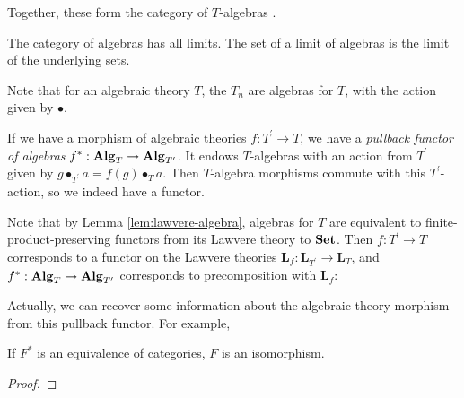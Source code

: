 Together, these form the category of $ T $-algebras .

\begin{remark}
  The category of algebras has all limits. The set of a limit of algebras is the limit of the underlying sets.
\end{remark}

\begin{remark}
  Note that for an algebraic theory $ T $, the $ T_n $ are algebras for $ T $, with the action given by $ \bullet $.
\end{remark}

\begin{definition}\label{def:algebra-pullback}
  If we have a morphism of algebraic theories $ f: T^\prime \to T $, we have a \textit{pullback functor of algebras} $ f^* : \mathbf{Alg}_{T} \to \mathbf{Alg}_{T^\prime} $. It endows $ T $-algebras with an action from $ T^\prime $ given by $ g \bullet_{T^\prime} a = f(g) \bullet_T a $. Then $ T $-algebra morphisms commute with this $ T^\prime $-action, so we indeed have a functor.
\end{definition}

\begin{remark}
  Note that by Lemma \ref{lem:lawvere-algebra}, algebras for $ T $ are equivalent to finite-product-preserving functors from its Lawvere theory to $ \mathbf{Set} $. Then $ f: T^\prime \to T $ corresponds to a functor on the Lawvere theories $ \mathbf L_f: \mathbf L_{T^\prime} \to \mathbf L_T $, and $ f^*: \mathbf{Alg}_{T} \to \mathbf{Alg}_{T^\prime} $ corresponds to precomposition with $ \mathbf L_f $:
  \begin{center}
  \end{center}
\end{remark}

Actually, we can recover some information about the algebraic theory morphism from this pullback functor. For example,
\begin{lemma}\label{lem:algebra-pullback-equivalence}
  If $ F^* $ is an equivalence of categories, $ F $ is an isomorphism.
\end{lemma}
\begin{proof}
  \TODO
\end{proof}

